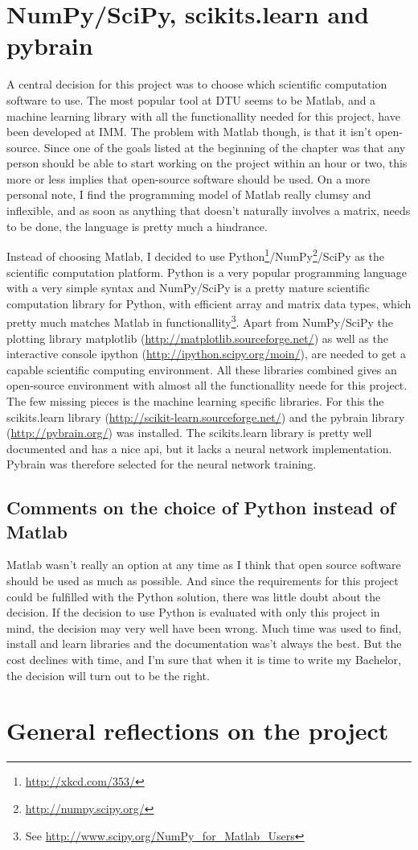 \section{NumPy/SciPy, scikits.learn and pybrain}
A central decision for this project was to choose which scientific computation software to use. The most popular tool at DTU seems to be Matlab, and a machine learning library with all the functionallity needed for this project, have been developed at IMM. The problem with Matlab though, is that it isn't open-source. Since one of the goals listed at the beginning of the chapter was that any person should be able to start working on the project within an hour or two, this more or less implies that open-source software should be used. On a more personal note, I find the programming model of Matlab really clumsy and inflexible, and as soon as anything that doesn't naturally involves a matrix, needs to be done, the language is pretty much a hindrance. \par
Instead of choosing Matlab, I decided to use Python\footnote{\url{http://xkcd.com/353/}}/NumPy\footnote{\url{http://numpy.scipy.org/}}/SciPy as the scientific computation platform. Python is a very popular programming language with a very simple syntax and NumPy/SciPy is a pretty mature scientific computation library for Python, with efficient array and matrix data types, which pretty much matches Matlab in functionallity\footnote{See \url{http://www.scipy.org/NumPy_for_Matlab_Users}}. Apart from NumPy/SciPy the plotting library matplotlib (\url{http://matplotlib.sourceforge.net/}) as well as the interactive console ipython (\url{http://ipython.scipy.org/moin/}), are needed to get a capable scientific computing environment. All these libraries combined gives an open-source environment with almost all the functionallity neede for this project. The few missing pieces is the machine learning specific libraries. For this the scikits.learn library (\url{http://scikit-learn.sourceforge.net/}) and the pybrain library (\url{http://pybrain.org/}) was installed. The scikits.learn library is pretty well documented and has a nice api, but it lacks a neural network implementation. Pybrain was therefore selected for the neural network training. 

\subsection{Comments on the choice of Python instead of Matlab}
Matlab wasn't really an option at any time as I think that open source software should be used as much as possible. And since the requirements for this project could be fulfilled with the Python solution, there was little doubt about the decision. If the decision to use Python is evaluated with only this project in mind, the decision may very well have been wrong. Much time was used to find, install and learn libraries and the documentation was't always the best. But the cost declines with time, and I'm sure that when it is time to write my Bachelor, the decision will turn out to be the right. 


\section{General reflections on the project}




